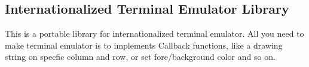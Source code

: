 \subsection*{Internationalized Terminal Emulator Library}This is a portable library for internationalized terminal emulator. All you need to make terminal emulator is to implements Callback functions, like a drawing string on specfic column and row, or set fore/background color and so on.